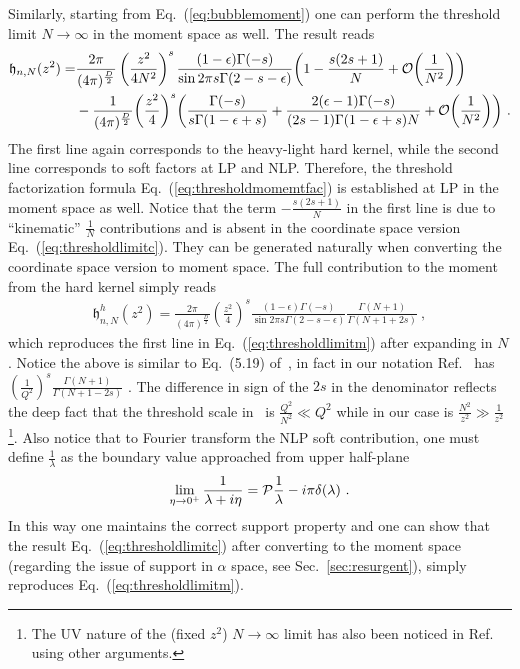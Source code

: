 \documentclass[a4paper,11pt]{article}
\begin{document}
Similarly, starting from Eq.~(\ref{eq:bubblemoment}) one can perform the threshold limit $N\rightarrow \infty$ in the moment space as well. The result reads
\begin{align}\label{eq:thresholdlimitm}
\mathfrak{h}_{n,N}(z^2)=&\frac{2\pi}{(4\pi)^{\frac{D}{2}}}\left(\frac{z^2}{4N^2}\right)^s\frac{(1-\epsilon)\Gamma(-s)}{\sin 2\pi s \Gamma(2-s-\epsilon)}\bigg(1-\frac{s(2s+1)}{N}+{\cal O}\bigg(\frac{1}{N^2}\bigg)\bigg) \nonumber \\ 
&-\frac{1}{(4\pi)^{\frac{D}{2}}}\bigg(\frac{z^2}{4}\bigg)^s\bigg(\frac{\Gamma(-s)}{s\Gamma(1-\epsilon+s)}+\frac{2(\epsilon-1)\Gamma(-s)}{(2s-1)\Gamma(1-\epsilon+s)N}+{\cal O}\bigg(\frac{1}{N^2}\bigg)\bigg) \ .
\end{align}
The first line again corresponds to the heavy-light hard kernel, while the second line corresponds to soft factors at LP and NLP. Therefore, the threshold factorization formula Eq.~(\ref{eq:thresholdmomemtfac}) is established at LP in the moment space as well. Notice that the term $-\frac{s(2s+1)}{N}$ in the first line is due to ``kinematic'' $\frac{1}{N}$ contributions and is absent in the coordinate space version Eq.~(\ref{eq:thresholdlimitc}). They can be generated naturally when converting the coordinate space version to moment space. The full contribution to the moment from the hard kernel simply reads
\begin{align}\label{eq:threshmoment}
\mathfrak{h}_{n,N}^h(z^2)=\frac{2\pi}{(4\pi)^{\frac{D}{2}}}\left(\frac{z^2}{4}\right)^s\frac{(1-\epsilon)\Gamma(-s)}{\sin 2\pi s \Gamma(2-s-\epsilon)}\frac{\Gamma(N+1)}{\Gamma(N+1+2s)} \ ,
\end{align}
which reproduces the first line in Eq.~(\ref{eq:thresholdlimitm}) after expanding in $N$. Notice the above is similar to Eq.~(5.19) of~\cite{Beneke:1995pq}, in fact in our notation Ref.~\cite{Beneke:1995pq}  has $\left(\frac{1}{Q^2}\right)^s\frac{\Gamma(N+1)}{\Gamma(N+1-2s)}$ . The difference in sign of the $2s$ in the denominator reflects the deep fact that the threshold scale in~\cite{Beneke:1995pq} is $\frac{Q^2}{N^2} \ll Q^2$ while in our case is $\frac{N^2}{z^2} \gg \frac{1}{z^2}$\footnote{The UV nature of the (fixed $z^2$)  $N\rightarrow \infty$ limit  has also been noticed in Ref.~\cite{Gao:2021hxl} using other arguments. }.  Also notice that to Fourier transform the NLP soft contribution, one must define $\frac{1}{\lambda}$ as the  boundary value approached from upper half-plane
\begin{align}
\lim_{\eta \rightarrow 0^+}\frac{1}{\lambda+i\eta}={\cal P}\frac{1}{\lambda}-i\pi \delta(\lambda) \ .
\end{align}
In this way one maintains the correct support property and one can show that the result Eq.~(\ref{eq:thresholdlimitc}) after converting to the moment space (regarding the issue of support in $\alpha$ space, see Sec.~\ref{sec:resurgent}), simply reproduces Eq.~(\ref{eq:thresholdlimitm}).
\end{document}

